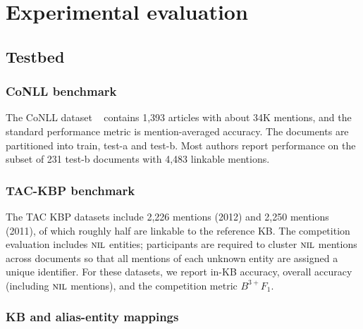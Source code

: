 \section{Experimental evaluation}
\label{sec:expt}

\subsection{Testbed}

\subsubsection{CoNLL benchmark}

The CoNLL dataset ~\cite{Hoffart2011} contains 1,393 articles with
about 34K mentions, and the standard performance metric is
mention-averaged accuracy.  The documents are partitioned into train,
test-a and test-b.  Most authors report performance on the subset of
231 test-b documents with 4,483 linkable mentions.

\subsubsection{TAC-KBP benchmark}

The TAC KBP datasets \cite{TAC2011,TAC2012} include 2,226 mentions
(2012) and 2,250 mentions (2011), of which roughly half are linkable
to the reference KB.  The competition evaluation includes $\mbox{\textsc{nil}}$
entities; participants are required to cluster $\mbox{\textsc{nil}}$ mentions across
documents so that all mentions of each unknown entity are assigned a
unique identifier.  For these datasets, we report in-KB accuracy,
overall accuracy (including $\mbox{\textsc{nil}}$ mentions), and the competition
metric $B^{3+} F_1$.  

\subsubsection{KB and alias-entity mappings}

